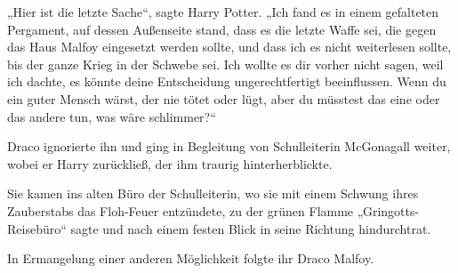 „Hier ist die letzte Sache“, sagte Harry Potter.
„Ich fand es in einem gefalteten Pergament, auf dessen Außenseite stand, dass es die letzte Waffe sei, die gegen das Haus Malfoy eingesetzt werden sollte, und dass ich es nicht weiterlesen sollte, bis der ganze Krieg in der Schwebe sei. Ich wollte es dir vorher nicht sagen, weil ich dachte, es könnte deine Entscheidung ungerechtfertigt beeinflussen. Wenn du ein guter Mensch wärst, der nie tötet oder lügt, aber du müsstest das eine oder das andere tun, was wäre schlimmer?“

Draco ignorierte ihn und ging in Begleitung von Schulleiterin McGonagall weiter, wobei er Harry zurückließ, der ihm traurig hinterherblickte.

Sie kamen ins alten Büro der Schulleiterin, wo sie mit einem Schwung ihres Zauberstabs das Floh-Feuer entzündete, zu der grünen Flamme
„Gringotts-Reisebüro“ sagte und nach einem festen Blick in seine Richtung hindurchtrat.

In Ermangelung einer anderen Möglichkeit folgte ihr Draco Malfoy.

\later

